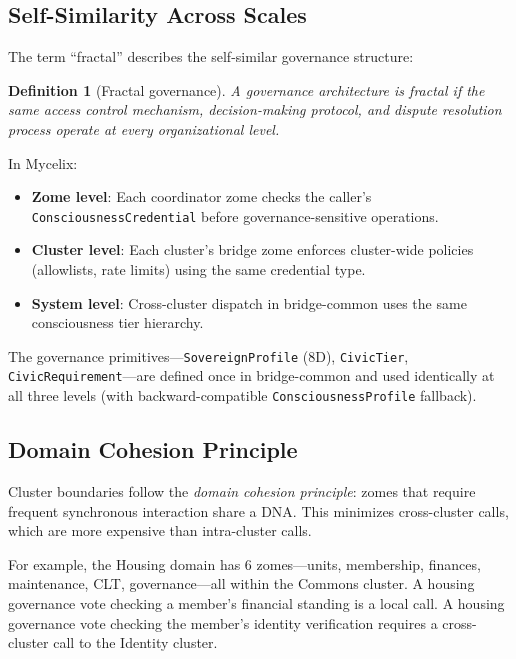 \documentclass[11pt,twocolumn]{article}
\newtheorem{definition}{Definition}
\begin{document}
\subsection{Self-Similarity Across Scales}

The term ``fractal'' describes the self-similar governance structure:

\begin{definition}[Fractal governance]
A governance architecture is fractal if the same access control mechanism,
decision-making protocol, and dispute resolution process operate at every
organizational level.
\end{definition}

In Mycelix:

\begin{itemize}[nosep]
  \item \textbf{Zome level}: Each coordinator zome checks the caller's
    \texttt{ConsciousnessCredential} before governance-sensitive operations.
  \item \textbf{Cluster level}: Each cluster's bridge zome enforces
    cluster-wide policies (allowlists, rate limits) using the same
    credential type.
  \item \textbf{System level}: Cross-cluster dispatch in bridge-common
    uses the same consciousness tier hierarchy.
\end{itemize}

The governance primitives---\texttt{SovereignProfile} (8D),
\texttt{CivicTier}, \texttt{CivicRequirement}---are defined
once in bridge-common and used identically at all three levels (with backward-compatible \texttt{ConsciousnessProfile} fallback).

\subsection{Domain Cohesion Principle}

Cluster boundaries follow the \emph{domain cohesion principle}: zomes that
require frequent synchronous interaction share a DNA. This minimizes
cross-cluster calls, which are more expensive than intra-cluster calls.

For example, the Housing domain has 6 zomes---units, membership, finances,
maintenance, CLT, governance---all within the Commons cluster. A housing
governance vote checking a member's financial standing is a local call.
A housing governance vote checking the member's identity verification
requires a cross-cluster call to the Identity cluster.
\end{document}
